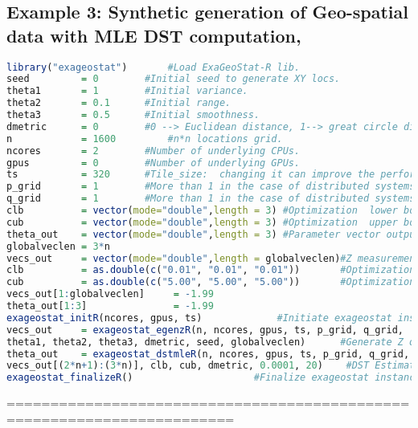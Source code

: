 \documentclass[
10pt, %
a4paper, %
oneside, %
headinclude,footinclude, %
BCOR5mm, %
]{scrartcl}
\begin{document}
\subsection{Example 3: Synthetic generation of Geo-spatial data with MLE DST computation,}
\begin{lstlisting}[language=R]
library("exageostat") 		#Load ExaGeoStat-R lib.
seed         = 0 		#Initial seed to generate XY locs.
theta1       = 1 		#Initial variance.
theta2       = 0.1 		#Initial range.
theta3       = 0.5 		#Initial smoothness.
dmetric      = 0 		#0 --> Euclidean distance, 1--> great circle distance.
n            = 1600 		#n*n locations grid.
ncores       = 2 		#Number of underlying CPUs.
gpus         = 0 		#Number of underlying GPUs.
ts           = 320 		#Tile_size:  changing it can improve the performance. 
p_grid       = 1 		#More than 1 in the case of distributed systems.
q_grid       = 1 		#More than 1 in the case of distributed systems.
clb          = vector(mode="double",length = 3) #Optimization  lower bounds values.
cub          = vector(mode="double",length = 3) #Optimization  upper bounds values.
theta_out    = vector(mode="double",length = 3) #Parameter vector output.
globalveclen = 3*n
vecs_out     = vector(mode="double",length = globalveclen)#Z measurements of n locations.
clb          = as.double(c("0.01", "0.01", "0.01")) 	  #Optimization lower bounds.
cub          = as.double(c("5.00", "5.00", "5.00"))  	  #Optimization upper bounds.
vecs_out[1:globalveclen]     = -1.99
theta_out[1:3]               = -1.99
exageostat_initR(ncores, gpus, ts) 			   #Initiate exageostat instance.
vecs_out     = exageostat_egenzR(n, ncores, gpus, ts, p_grid, q_grid,
theta1, theta2, theta3, dmetric, seed, globalveclen) 	  #Generate Z observation vector.
theta_out    = exageostat_dstmleR(n, ncores, gpus, ts, p_grid, q_grid,  vecs_out[1:n],  vecs_out[n+1:(2*n)],
vecs_out[(2*n+1):(3*n)], clb, cub, dmetric, 0.0001, 20)    #DST Estimation (MLE).
exageostat_finalizeR() 					   #Finalize exageostat instance
\end{lstlisting}
========================================================================
\end{document}
